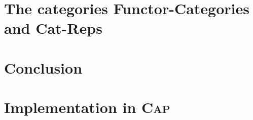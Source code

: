 \documentclass{article}
\theoremstyle{definition}
\begin{document}
\section{The categories Functor-Categories and Cat-Reps}
\section{Conclusion}



\appendix
\renewcommand{\thesection}{\Alph{section}}
\section{Implementation in \textsc{Cap}}

\end{document}
